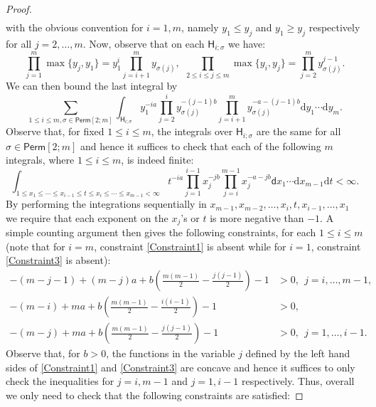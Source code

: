 \documentclass[]{article}
\begin{document}
\begin{proof}
\begin{align*}
\end{align*}
with the obvious convention for $i=1,m$, namely $y_1\le y_j$ and $y_1\ge y_j$ respectively for all $j=2,\dots,m$. Now, observe that on each $\mathsf{H}_{i;\sigma}$ we have:
\begin{equation*}
\prod_{j=1}^m\max\{y_j,y_1\}=y_1^{i}\prod_{j=i+1}^my_{\sigma(j)}, \ \ \prod_{2\le i \le j \le m} \max\{y_i,y_j\}=\prod_{j=2}^m y_{\sigma(j)}^{j-1}.
\end{equation*}
We can then bound the last integral by
\begin{equation*}
\sum_{1\le i \le m, \sigma \in \mathsf{Perm}[2;m]}\int_{\mathsf{H}_{i;\sigma}} y_1^{-ia}\prod_{j=2}^{i}y_{\sigma(j)}^{-(j-1)b}\prod_{j=i+1}^my_{\sigma(j)}^{-a-(j-1)b}\mathrm{d}y_1 \cdots \mathrm{d}y_m.
\end{equation*}
Observe that, for fixed $1\le i \le m$, the integrals over $\mathsf{H}_{i;\sigma}$ are the same for all $\sigma \in \mathsf{Perm}[2;m]$ and hence it suffices to check that each of the following $m$ integrals, where $1\le i \le m$, is indeed finite:
\begin{equation*}
\int_{1 \le x_1\le \cdots \le x_{i-1}\le t \le x_i \le \cdots \le x_{m-1}<\infty} t^{-ia}\prod_{j=1}^{i-1}x_j^{-jb}\prod_{j=i}^{m-1}x_j^{-a-jb}\mathsf{d}x_1\cdots \mathrm{d}x_{m-1}\mathrm{d}t<\infty.
\end{equation*}
By performing the integrations sequentially in $x_{m-1}, x_{m-2},\dots, x_i, t, x_{i-1}, \dots,x_1$ we require that each exponent on the $x_j$'s or $t$ is more negative than $-1$. A simple counting argument then gives the following constraints, for each $1\le i \le m $ (note that for $i=m$, constraint \eqref{Constraint1} is absent while for $i=1$, constraint \eqref{Constraint3} is absent):
\begin{align}
 -(m-j-1)+(m-j)a+b\left(\frac{m(m-1)}{2}-\frac{j(j-1)}{2}\right) -1 &>0, \ \ j=i,\dots,m-1,\label{Constraint1}\\
-(m-i)+ma+b\left(\frac{m(m-1)}{2}-\frac{i(i-1)}{2}\right)-1 &>0,\nonumber\\
  -(m-j)+ma+b\left(\frac{m(m-1)}{2}-\frac{j(j-1)}{2}\right)-1&>0, \ \ j=1,\dots,i-1.\label{Constraint3}
\end{align}
Observe that, for $b>0$, the functions in the variable $j$ defined by the left hand sides of \eqref{Constraint1} and \eqref{Constraint3} are concave and hence it suffices to only check the inequalities for $j=i,m-1$ and $j=1,i-1$ respectively.
Thus, overall we only need to check that the following constraints are satisfied:

\end{proof}
\end{document}
